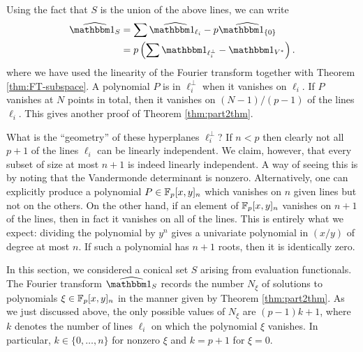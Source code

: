 Using the fact that $S$ is the union of the above lines, we can write
\begin{align*}
	\widehat{\IND_S} &= \sum \widehat{\IND_{\ell_i}} - p\widehat{\IND_{\{0\}}} \\
	&= p\left(\sum \IND_{\ell_i^\bot} - \IND_{V^*}\right).
\end{align*}
where we have used the linearity of the Fourier transform together with Theorem \ref{thm:FT-subspace}. A polynomial $P$ is in $\ell_i^\bot$ when it vanishes on $\ell_i$. If $P$ vanishes at $N$ points in total, then it vanishes on $(N - 1)/(p-1)$ of the lines $\ell_i$. This gives another proof of Theorem \ref{thm:part2thm}.

What is the ``geometry'' of these hyperplanes $\ell_i^\bot$? If $n < p$ then clearly not all $p+1$ of the lines $\ell_i$ can be linearly independent. We claim, however, that every subset of size at most $n+1$ is indeed linearly independent. A way of seeing this is by noting that the Vandermonde determinant is nonzero. Alternatively, one can explicitly produce a polynomial $P \in \mathbb{F}_p[x,y]_n$ which vanishes on $n$ given lines but not on the others. On the other hand, if an element of $\mathbb{F}_p[x,y]_n$ vanishes on $n+1$ of the lines, then in fact it vanishes on all of the lines. This is entirely what we expect: dividing the polynomial by $y^n$ gives a univariate polynomial in $(x/y)$ of degree at most $n$. If such a polynomial has $n+1$ roots, then it is identically zero.

In this section, we considered a conical set $S$ arising from evaluation functionals. The Fourier transform $\widehat{\IND_S}$ records the number $N_\xi$ of solutions to polynomials $\xi\in\mathbb{F}_p[x,y]_n$ in the manner given by Theorem \ref{thm:part2thm}. As we just discussed above, the only possible values of $N_\xi$ are $(p-1)k + 1$, where $k$ denotes the number of lines $\ell_i$ on which the polynomial $\xi$ vanishes. In particular, $k\in\{0,\ldots,n\}$ for nonzero $\xi$ and $k=p+1$ for $\xi = 0$.
